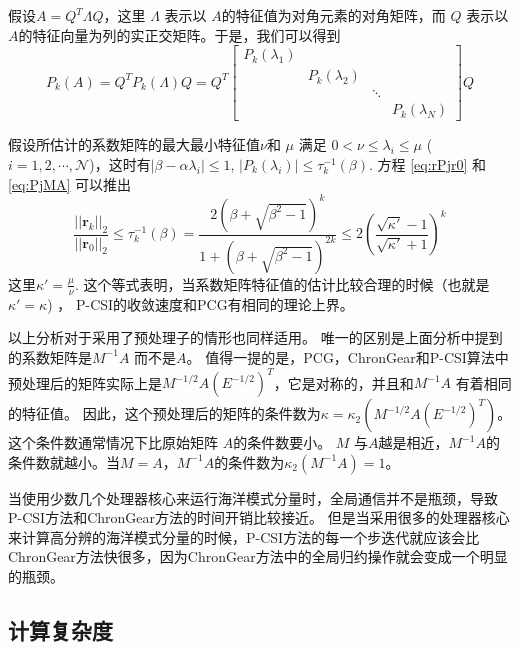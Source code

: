 假设$A= Q^T\Lambda Q$，这里 $\Lambda$ 表示以  $A$的特征值为对角元素的对角矩阵，而 $Q$ 表示以  $A$的特征向量为列的实正交矩阵。于是，我们可以得到
\begin{equation}
P_k(A) = Q^T P_k(\Lambda)Q = Q^T \left [\begin{array}{cccc}
P_k(\lambda_1) & & &\\
& P_k(\lambda_2) & &\\
& & \ddots &\\
 & & & P_k(\lambda_N)
\end{array} \right ] Q \label{eq:PjMA}
\end{equation}
 
假设所估计的系数矩阵的最大最小特征值$\nu$和 $\mu$ 满足 $0 < \nu \le \lambda_i \le \mu$ ($i = 1, 2, \cdots, \mathcal{N}$)，这时有$|\beta - \alpha \lambda_i| \le 1$, $|P_k(\lambda_i)| \le \tau^{-1}_k (\beta)$.
方程 \ref{eq:rPjr0} 和 \ref{eq:PjMA} 可以推出
\begin{equation}
\label{pcsi_convergence}
\frac{||\textbf{r}_k||_2}{||\textbf{r}_0||_2}  \le  \tau_k^{-1}(\beta) = \frac{2(\beta+\sqrt{\beta^2-1})^k}{1+(\beta+\sqrt{\beta^2-1})^{2k}} \le 2(\frac{\sqrt{\kappa'}-1}{\sqrt{\kappa'}+1})^k
\end{equation}
这里$\kappa' = \frac{\mu}{\nu}$.
 这个等式表明，当系数矩阵特征值的估计比较合理的时候（也就是$\kappa' =\kappa$) ， P-CSI的收敛速度和PCG有相同的理论上界。


 
以上分析对于采用了预处理子的情形也同样适用。
唯一的区别是上面分析中提到的系数矩阵是$M^{-1}A$ 而不是$A$。
值得一提的是，PCG，ChronGear和P-CSI算法中预处理后的矩阵实际上是$M^{-1/2}A(E^{-1/2})^T$，它是对称的，并且和$M^{-1}A$ 有着相同的特征值\cite{Shewchuk1994}。
因此，这个预处理后的矩阵的条件数为$\kappa =  \kappa_2(M^{-1/2}A(E^{-1/2})^T)$。这个条件数通常情况下比原始矩阵 $A$的条件数要小。 
 $M$ 与$A$越是相近，$M^{-1}A$的条件数就越小。当$M = A$，$M^{-1}A$的条件数为$\kappa_2(M^{-1 }A ) = 1$。 

 当使用少数几个处理器核心来运行海洋模式分量时，全局通信并不是瓶颈，导致P-CSI方法和ChronGear方法的时间开销比较接近。
但是当采用很多的处理器核心来计算高分辨的海洋模式分量的时候，P-CSI方法的每一个步迭代就应该会比ChronGear方法快很多，因为ChronGear方法中的全局归约操作就会变成一个明显的瓶颈。

\subsection{计算复杂度}  \label{solver:Algorithm:complex}


